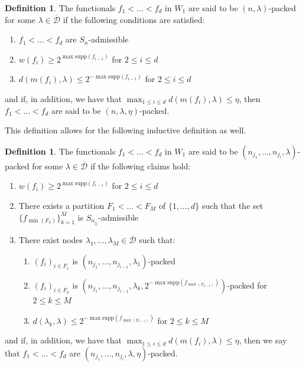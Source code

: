 \documentclass[12pt,a4paper]{amsart}
\newcommand{\supp}{\text{supp}}
\theoremstyle{definition}
\newtheorem{definition}[question]{Definition}
\theoremstyle{plain}
\begin{document}
\begin{definition}{\label{packed}}
The functionals $f_{1}<\ldots<f_{d}$ in $W_{1}$ are said to be $(n,\lambda)$-packed for some $\lambda\in\overline{\mathcal{D}}$ if the following conditions are satisfied:
\begin{enumerate}
\item $f_{1}<\ldots<f_{d}$ are $S_{n}$-admissible
\item $w(f_{i})\geq 2^{\max\supp(f_{i-1})}$ for $2\leq i\leq d$
\item $d(m(f_{i}),\lambda)\leq 2^{-\max\supp(f_{i-1})}$ for $2\leq i\leq d$
\end{enumerate}
and if, in addition, we have that $\max_{1\leq i\leq d}d(m(f_{i}),\lambda)\leq \eta$, then $f_{1}<\ldots<f_{d}$ are said to be $(n,\lambda,\eta)$-packed.
\end{definition}

This definition allows for the following inductive definition as well.

\begin{definition}{\label{big_packed}}
The functionals $f_{1}<\ldots<f_{d}$ in $W_{1}$ are said to be $(n_{j_{1}},\ldots,n_{j_{l}},\lambda)$-packed for some $\lambda\in\overline{\mathcal{D}}$ if the following claims hold:
\begin{enumerate}
\item $w(f_{i})\geq 2^{\max\supp(f_{i-1})}$ for $2\leq i\leq d$
\item There exists a partition $F_{1}<\ldots<F_{M}$ of $\{1,\ldots,d\}$ such that the set $\{f_{\min(F_{k})}\}_{k=1}^{M}$ is $S_{n_{j_{l}}}$-admissible
\item There exist nodes $\lambda_{1},\ldots,\lambda_{M}\in\overline{\mathcal{D}}$ such that:
\begin{enumerate}
\item $(f_{i})_{i\in F_{1}}$ is $(n_{j_{1}},\ldots,n_{j_{l-1}},\lambda_{1})$-packed
\item $(f_{i})_{i\in F_{k}}$ is $(n_{j_{1}},\ldots,n_{j_{l-1}},\lambda_{k},2^{-\max\supp(f_{\max(F_{k-1})})})$-packed for $2\leq k\leq M$
\item $d(\lambda_{k},\lambda)\leq 2^{-\max\supp(f_{\max(F_{k-1})})}$ for $2\leq k\leq M$
\end{enumerate}
\end{enumerate}
and if, in addition, we have that $\max_{1\leq i\leq d}d(m(f_{i}),\lambda)\leq\eta$, then we say that $f_{1}<\ldots<f_{d}$ are $(n_{j_{1}},\ldots,n_{j_{l}},\lambda,\eta)$-packed.
\end{definition}
\end{document}
